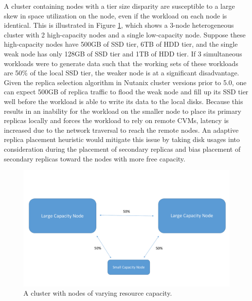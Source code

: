 \documentclass[12pt]{article}
\begin{document}
    A cluster containing nodes with a tier size disparity are susceptible to a
    large skew in space utilization on the node, even if the workload on each
    node is identical. This is illustrated in Figure
    \ref{fig:tier_size_disparity}, which shows a 3-node heterogeneous cluster
    with 2 high-capacity nodes and a single low-capacity node.  Suppose these
    high-capacity nodes have 500GB of SSD tier, 6TB of HDD tier, and the single
    weak node has only 128GB of SSD tier and 1TB of HDD tier. If 3 simultaneous
    workloads were to generate data such that the working sets of these
    workloads are 50\% of the local SSD tier, the weaker node is at a
    significant disadvantage. Given the replica selection algorithm in Nutanix
    cluster versions prior to 5.0, one can expect 500GB of replica traffic to
    flood the weak node and fill up its SSD tier well before the workload is
    able to write its data to the local disks.  Because this results in an
    inability for the workload on the smaller node to place its primary
    replicas locally and forces the workload to rely on remote CVMs, latency is
    increased due to the network traversal to reach the remote nodes. An
    adaptive replica placement heuristic would mitigate this issue by taking
    disk usages into consideration during the placement of secondary replicas
    and bias placement of secondary replicas toward the nodes with more free
    capacity.

    \begin{figure}[htbp]
      \centering
      \includegraphics[scale=0.30]{images/homogeneous_tier_disparity.pdf} 
      \caption{A cluster with nodes of varying resource capacity.}
      \label{fig:tier_size_disparity}
    \end{figure}


\newpage
\FloatBarrier
\end{document}
